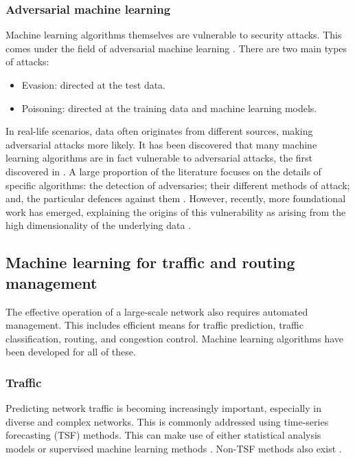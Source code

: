 \documentclass[twocolumn, aps, rmp, amsmath, amssymb, nofootinbib, superscriptaddress, longbibliography, floatfix, table-of-contents, eqsecnum]{revtex4}
\begin{document}
\subsubsection{Adversarial machine learning} 

Machine learning algorithms themselves are vulnerable to security attacks. This comes under the field of adversarial machine learning \cite{huang2011adversarial}. There are two main types of attacks:
\begin{itemize}
\item Evasion: directed at the test data.
\item Poisoning: directed at the training data and machine learning models.
\end{itemize}
In real-life scenarios, data often originates from different sources, making adversarial attacks more likely. It has been discovered that many machine learning algorithms are in fact vulnerable to adversarial attacks, the first discovered in \cite{szegedy2013intriguing}. A large proportion of the literature focuses on the details of specific algorithms: the detection of adversaries; their different methods of attack; and, the particular defences against them \cite{kurakin2018adversarial}. However, recently, more foundational work has emerged, explaining the origins of this vulnerability as arising from the high dimensionality of the underlying data \cite{goodfellow2014explaining, gilmer2018adversarial, mahloujifar2018curse}.

\subsection{Machine learning for traffic and routing management}

The effective operation of a large-scale network also requires automated management. This includes efficient means for traffic prediction, traffic classification, routing, and congestion control. Machine learning algorithms have been developed for all of these.

\subsubsection{Traffic}

Predicting network traffic is becoming increasingly important, especially in diverse and complex networks. This is commonly addressed using time-series forecasting (TSF) methods. This can make use of either statistical analysis models or supervised machine learning methods \cite{bermolen2009support, chabaa2010identification, cortez2006internet}. Non-TSF methods also exist \cite{chen2016predicting, li2016inter}.
\end{document}
